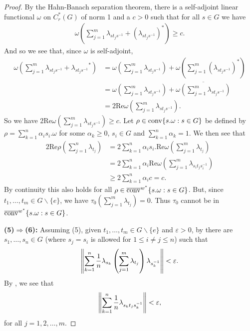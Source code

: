 \begin{theorem}
\begin{proof}
\noindent By the Hahn-Banach separation theorem, there is a self-adjoint linear functional $\omega$ on $C_r^*(G)$ of norm 1 and a $c>0$ such that for all $s \in G$ we have
\begin{align*}
\omega \left( \sum_{j=1}^m \lambda_{st_js^{-1}}+\left(\lambda_{st_j s^{-1}}\right)^*  \right) \geq c.
\end{align*}
And so we see that, since $\omega$ is self-adjoint,
\begin{align*}
\omega\left(\sum_{j = 1}^m \lambda_{s t_j s^{-1}}+ {\lambda_{s t_j s^{-1}}}^*\right)&=\omega\left( \sum_{j=1}^m \lambda_{st_js^{-1}}\right) + \omega\left( \sum_{j=1}^m  \left(\lambda_{s t_j s^{-1}}\right)^*\right)\\
&=\omega\left( \sum_{j=1}^m \lambda_{st_js^{-1}}\right) +  \overline{\omega\left( \sum_{j=1}^m \lambda_{s t_j s^{-1}} \right)}\\
&=2 \mathrm{Re} \omega\left( \sum_{j=1}^m \lambda_{st_js^{-1}}\right).
\end{align*}
So we have $2 \mathrm{Re} \omega \left(\sum_{j=1}^m \lambda_{st_js^{-1}}\right) \geq c$. Let $\rho \in \operatorname{conv}\{ s. \omega : s \in G\}$ be defined by $\rho=\sum_{k=1}^n \alpha_{i}s_{i}.\omega$ for some $\alpha_k \geq 0$, $s_i \in G$ and $\sum_{k=1}^n \alpha_k = 1$. We then see that
\begin{align*}
2\mathrm{Re}\rho\left(\sum_{j=1}^n \lambda_{t_j}\right) &= 2 \sum_{k=1}^n \alpha_{i}s_{i}. \mathrm{Re}\omega\left(\sum_{j=1}^m \lambda_{t_j}\right)\\
&= 2 \sum_{k=1}^n \alpha_i \mathrm{Re} \omega \left( \sum_{j=1}^m \lambda_{s_i t_j s_i^{-1}} \right)\\
&\geq 2 \sum_{k=1}^n \alpha_i c=c.
\end{align*}
By continuity this also holds for all $\rho \in \overline{\operatorname{conv}}^{w^*}\{ s.\omega : s \in G \}$. But, since $t_1,\dots,t_m \in G \backslash \{e\}$, we have $\tau_0\left(\sum_{j=1}^m \lambda_{t_j} \right) = 0$. Thus $\tau_0$ cannot be in $\overline{\operatorname{conv}}^{w^*}\{s. \omega : s \in G\}$.

\textbf{(5)$\Rightarrow$(6):} Assuming (5), given $t_1,\dots,t_m \in G \backslash \{e \}$ and $\varepsilon>0$, by  there are $s_1,\dots,s_n \in G$ (where $s_j=s_i$ is allowed for $1 \leq i \neq j \leq n$) such that 
\begin{align*}
\left\lVert {\sum_{k=1}^n \frac{1}{n} \lambda_{s_k} \left( \sum_{j=1}^m \lambda_{t_j} \right) \lambda_{s_k^{-1}}} \right\rVert < \varepsilon.
\end{align*}
By , we see that 
\begin{align*}
\left\lVert \sum_{k=1}^n \frac{1}{n} \lambda_{s_kt_js_k^{-1}} \right\rVert < \varepsilon, 
\end{align*}
for all $j = 1 , 2 , \dots , m$.


\end{proof}
\end{theorem}
